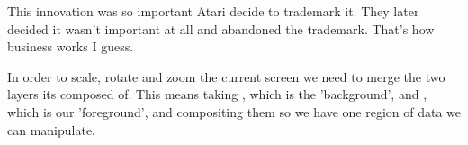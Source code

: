 This innovation was so important Atari decide to trademark it. They later decided it
wasn't important at all and abandoned the trademark. That's how business works I guess. 

In order to scale, rotate and zoom the current screen we need to merge the two layers its
composed of. This means taking , which is the 'background', and ,
which is our 'foreground', and compositing them so we have one region of data we can manipulate. 

\begin{figure}[H]
  {
    \setlength{\tabcolsep}{3.0pt}
    \setlength\cmidrulewidth{\heavyrulewidth} %
    }
\end{figure}
